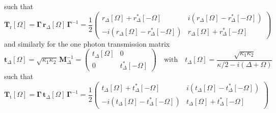 such that 
\begin{equation}
\mathbf{T}_{\mathrm{r}}[\Omega] = \mathbf{\Gamma} \, \mathbf{r}_{\Delta}[\Omega] \, \mathbf{\Gamma}^{-1} = \frac{1}{2}  \begin{pmatrix}
    r_{\Delta}[\Omega] + r_{\Delta}^*[-\Omega] & i(r_{\Delta}[\Omega] - r_{\Delta}^*[-\Omega]) \\
    -i(r_{\Delta}[\Omega] - r_{\Delta}^*[-\Omega]) & r_{\Delta}[\Omega] + r_{\Delta}^*[-\Omega]
  \end{pmatrix}
\end{equation}
and similarly for the one photon transmission matrix
\begin{equation}
  \mathbf{t}_{\Delta}[\Omega] = \sqrt{\kappa_1 \kappa_2} \, \mathbf{M}^{-1}_\Delta = \begin{pmatrix}
    t_{\Delta}[\Omega] & 0 \\
    0 & t_{\Delta}^*[-\Omega]
  \end{pmatrix} \quad \text{with} \quad t_{\Delta}[\Omega] = \frac{\sqrt{\kappa_1 \kappa_2}}{\kappa/2 - i(\Delta + \Omega)}
\end{equation}
such that
\begin{equation}
\mathbf{T}_{\mathrm{t}}[\Omega] = \mathbf{\Gamma} \, \mathbf{t}_{\Delta}[\Omega] \, \mathbf{\Gamma}^{-1} = \frac{1}{2}  \begin{pmatrix}
    t_{\Delta}[\Omega] + t_{\Delta}^*[-\Omega] & i(t_{\Delta}[\Omega] - t_{\Delta}^*[-\Omega]) \\
    -i(t_{\Delta}[\Omega] - t_{\Delta}^*[-\Omega]) & t_{\Delta}[\Omega] + t_{\Delta}^*[-\Omega]
  \end{pmatrix}
\end{equation}

